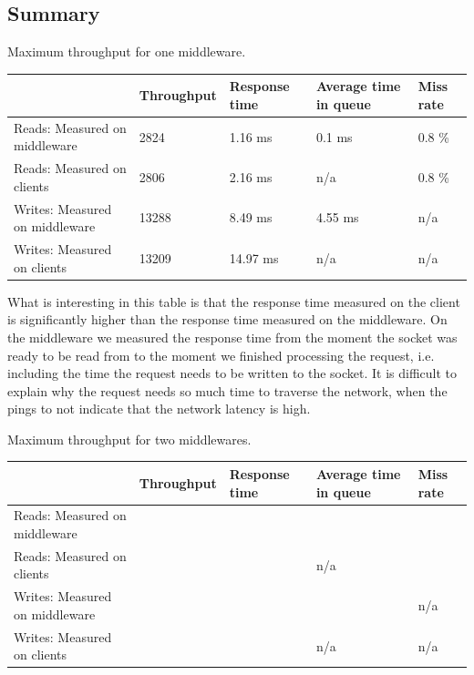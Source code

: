 \documentclass[11pt,a4paper]{article}
\begin{document}
\subsection{Summary}
%
\begin{center}
	{Maximum throughput for one middleware.}
	\begin{tabular}{|l|p{2cm}|p{2cm}|p{2cm}|p{2cm}|}
		\hline                                & Throughput & Response time & Average time in queue & Miss rate \\ 
		\hline Reads: Measured on middleware  &   2824     &     1.16 ms   &         0.1 ms        &   0.8 \%  \\ 
		\hline Reads: Measured on clients     &   2806     &     2.16 ms   & n/a                   &   0.8 \%  \\ 
		\hline Writes: Measured on middleware &  13288     &     8.49 ms   &         4.55 ms       & n/a       \\ 
		\hline Writes: Measured on clients    &  13209     &     14.97 ms  & n/a                   & n/a       \\ 
		\hline 
	\end{tabular}
\end{center}
%
What is interesting in this table is that the response time measured on the client is significantly higher than the response time measured on the middleware.
%
On the middleware we measured the response time from the moment the socket was ready to be read from to the moment we finished processing the request, i.e. including the time the request needs to be written to the socket.
%
It is difficult to explain why the request needs so much time to traverse the network, when the pings to not indicate that the network latency is high.
%
%
\begin{center}
	{Maximum throughput for two middlewares.}
	\begin{tabular}{|l|p{2cm}|p{2cm}|p{2cm}|p{2cm}|}
		\hline                                & Throughput & Response time & Average time in queue & Miss rate \\ 
		\hline Reads: Measured on middleware  &            &               &                       &           \\ 
		\hline Reads: Measured on clients     &            &               & n/a                   &           \\ 
		\hline Writes: Measured on middleware &            &               &                       & n/a       \\ 
		\hline Writes: Measured on clients    &            &               & n/a                   & n/a       \\ 
		\hline 
	\end{tabular}
\end{center}
%
\end{document}

